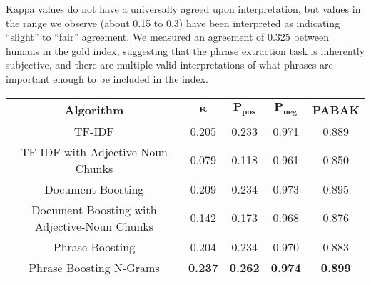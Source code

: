 Kappa values do not have a universally agreed upon interpretation, but
values in the range we observe (about 0.15 to 0.3) have been
interpreted as indicating ``slight'' to ``fair'' agreement. We measured an
agreement of 0.325 between humans in the gold index, suggesting that the phrase extraction
task is inherently subjective, and there are multiple valid
interpretations of what phrases are important enough to be included in
the index.



\begin{figure*}[!ht]
\caption{}
\label{fig:main_result}
\begin{tabular}{|c|c|c|c|c|}
\hline
\textbf{Algorithm} & $\mathbf{\kappa}$ & $\mathbf{P_{\text{pos}}}$ & $\mathbf{P_{\text{neg}}}$ & \textbf{PABAK} \\
\hline
TF-IDF & 0.205 & 0.233 & 0.971 & 0.889 \\
\hline
TF-IDF with Adjective-Noun Chunks & 0.079 & 0.118 & 0.961 & 0.850 \\
\hline
Document Boosting & 0.209 & 0.234 & 0.973 & 0.895 \\
\hline
Document Boosting with Adjective-Noun Chunks & 0.142 & 0.173 & 0.968 & 0.876 \\
\hline
Phrase Boosting & 0.204 & 0.234 & 0.970 & 0.883 \\
\hline
Phrase Boosting N-Grams & \textbf{0.237} & \textbf{0.262} & \textbf{0.974} & \textbf{0.899} \\
\hline
\end{tabular}
\end{figure*}

